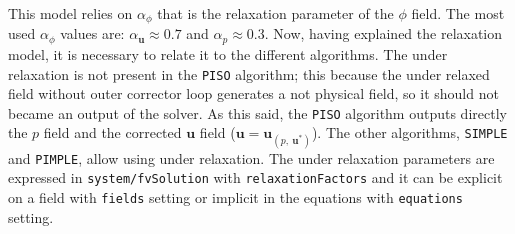 \noindent This model relies on $\alpha_{\phi}$ that is the relaxation parameter of the $\phi$ field. The most used $\alpha_{\phi}$ values are: $\alpha_{\boldsymbol{u}} \approx 0.7$ and $\alpha_{p} \approx 0.3$. Now, having explained the relaxation model, it is necessary to relate it to the different algorithms. The under relaxation is not present in the \verb|PISO| algorithm; this because the under relaxed field without outer corrector loop generates a not physical field, so it should not became an output of the solver. As this said, the \verb|PISO| algorithm outputs directly the $p$ field and the corrected $\boldsymbol{u}$ field ($\boldsymbol{u} = \boldsymbol{u}_{(p, \ \boldsymbol{u}^*)}$). The other algorithms, \verb|SIMPLE| and \verb|PIMPLE|, allow using under relaxation. The under relaxation parameters are expressed in \verb|system/fvSolution| with \verb|relaxationFactors| and it can be explicit on a field with \verb|fields| setting or implicit in the equations with \verb|equations| setting.
